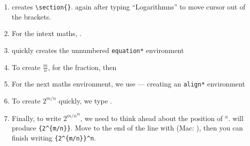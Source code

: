 \begin{enumerate}
    \item {} creates \verb|\section{}|. \keys{\tab} again after typing ``Logarithmns'' to move cursor out of the brackets.
    \item For the intext maths, \keys{$\backslash$( + \tab}.
    \item {} quickly creates the unnumbered \texttt{equation*} environment
    \item To create \( \frac{m}{n}  \),  for the fraction, then 
    \item For the next maths environment, we use  --- creating an \texttt{align*} environment
    \item To create \( 2^{m/n} \) quickly, we type .
    \item Finally, to write \( {2^{m/n}}^n \), we need to think ahead about the position of \( ^n \).  will produce \verb|{2^{m/n}}|. Move to the end of the line with \keys{\ctrl+\arrowkeyright} (Mac: \keys{\cmd+\arrowkeyright}), then you can finish writing \verb|{2^{m/n}}^n|.
\end{enumerate}

